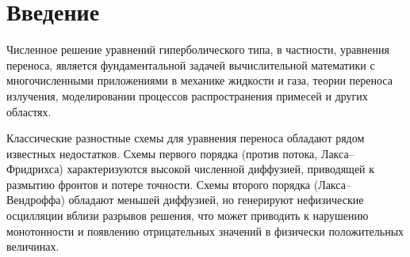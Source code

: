 \documentclass[14pt]{report}
\begin{document}
\begin{abstract}
В работе рассматривается модификация классической схемы Лакса--Фридрихса для численного решения уравнения переноса. Предложено семейство разностных схем, параметризованное величиной $\sigma$, позволяющее варьировать диссипативные свойства метода. С использованием разложения по Тейлору и коррекции старших членов ошибки на пятиточечном шаблоне построена схема повышенного порядка аппроксимации.

Проведен детальный анализ устойчивости схемы методом фон~\mbox{Неймана}. С применением систем компьютерной алгебры (СКА) на базе библиотеки \texttt{sympy} (Python) получено аналитическое представление множителя перехода и исследована зависимость области устойчивости от параметров схемы $(\nu, \sigma)$. Установлены необходимые и достаточные условия устойчивости.

Численно исследован порядок сходимости схемы, что подтверждает теоретические оценки. Схема сравнивается со сквозными разностными схемами, в частности, со схемой Русанова третьего порядка. Для подавления нефизических осцилляций вблизи разрывов предложены два подхода к монотонизации: метод адаптивной искусственной вязкости и гибридная схема, комбинирующая решения высокого и низкого порядков.

Численные эксперименты демонстрируют эффективность предложенных методов как на гладких, так и на разрывных решениях.
\end{abstract}

\tableofcontents


\chapter{Введение}

Численное решение уравнений гиперболического типа, в частности, уравнения переноса, является фундаментальной задачей вычислительной математики с многочисленными приложениями в механике жидкости и газа, теории переноса излучения, моделировании процессов распространения примесей и других областях.

Классические разностные схемы для уравнения переноса обладают рядом известных недостатков. Схемы первого порядка (против потока, Лакса--Фридрихса) характеризуются высокой численной диффузией, приводящей к размытию фронтов и потере точности. Схемы второго порядка (Лакса--Вендроффа) обладают меньшей диффузией, но генерируют нефизические осцилляции вблизи разрывов решения, что может приводить к нарушению монотонности и появлению отрицательных значений в физически положительных величинах.
\end{document}
